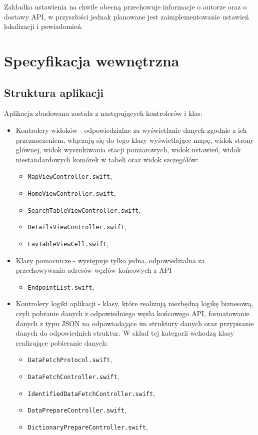 \documentclass[a4paper,11pt,titlepage]{article}
\begin{document}
Zakładka ustawienia na chwile obecną przechowuje informacje o autorze oraz o dostawy API, w przyszłości jednak planowane jest zaimplementowanie ustawień lokalizacji i powiadomień.

\section{Specyfikacja wewnętrzna}
\subsection{Struktura aplikacji}
Aplikacja zbudowana została z następujących kontrolerów i klas:
\begin{itemize}
 	\item Kontrolery widoków - odpowiedzialne za wyświetlanie danych zgodnie z ich przeznaczeniem, włączają się do tego klasy wyświetlające mapę, widok strony głównej, widok wyszukiwania stacji pomiarowych, widok ustawień, widok niestandardowych komórek w tabeli oraz widok szczegółów:
	\begin{itemize}
		\item \verb|MapViewController.swift|,
		\item \verb|HomeViewController.swift|, 
		\item \verb|SearchTableViewController.swift|,
		\item \verb|DetailsViewController.swift|,
		\item \verb|FavTableViewCell.swift|,
	\end{itemize}

	\item Klasy pomocnicze - występuje tylko jedna, odpowiedzialna za przechowywania adresów węzłów końcowych z API
	\begin{itemize}
		\item \verb|EndpointList.swift|,
	\end{itemize}

	\item Kontrolery logiki aplikacji - klasy, które realizują niezbędną logikę biznesową, czyli pobranie danych z odpowiedniego węzła końcowego API,  formatowanie danych z typu JSON na odpowiadające im struktury danych oraz przypisanie danych do odpowiednich struktur. W skład tej kategorii wchodzą klasy realizujące pobieranie danych:
	\begin{itemize}
		\item \verb|DataFetchProtocol.swift|,
		\item \verb|DataFetchController.swift|, 
		\item \verb|IdentifiedDataFetchController.swift|,
		\item \verb|DataPrepareController.swift|,
		\item \verb|DictionaryPrepareController.swift|,
	\end{itemize}


\end{itemize}
\end{document}
